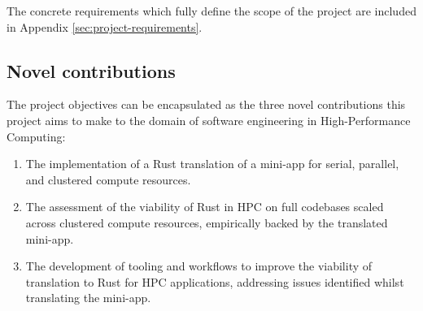 The concrete requirements which fully define the scope of the project are included in Appendix \ref{sec:project-requirements}.

\subsection{Novel contributions}
\label{ssec:objectives-novel-contributions}

The project objectives can be encapsulated as the three novel contributions this project aims to make to the domain of software engineering in High-Performance Computing:

\begin{enumerate}
    \item The implementation of a Rust translation of a mini-app for serial, parallel, and clustered compute resources.
    \item The assessment of the viability of Rust in HPC on full codebases scaled across clustered compute resources, empirically backed by the translated mini-app.
    \item The development of tooling and workflows to improve the viability of translation to Rust for HPC applications, addressing issues identified whilst translating the mini-app.
\end{enumerate}
